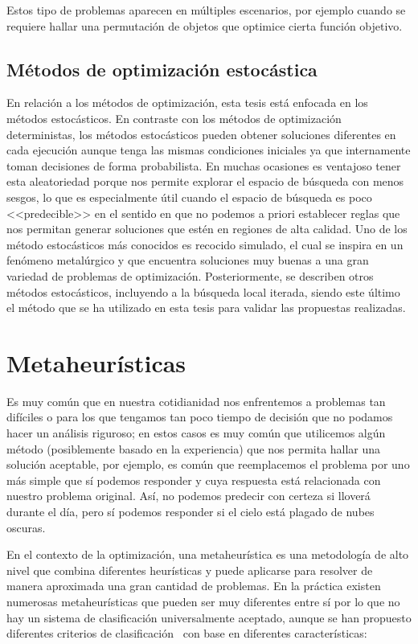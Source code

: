 Estos tipo de problemas aparecen en múltiples escenarios, por ejemplo cuando se requiere hallar una permutación de objetos que optimice cierta función objetivo.

\subsection*{Métodos de optimización estocástica}

En relación a los métodos de optimización, esta tesis está enfocada en los métodos estocásticos.
%
En contraste con los métodos de optimización deterministas, los métodos estocásticos pueden obtener soluciones diferentes en cada ejecución aunque tenga las mismas 
condiciones iniciales ya que internamente toman decisiones de forma probabilista.
%
En muchas ocasiones es ventajoso tener esta aleatoriedad porque nos permite explorar el espacio de búsqueda con menos sesgos, lo que es especialmente útil cuando el 
espacio de búsqueda es poco <<predecible>> en el sentido en que no podemos a priori establecer reglas que nos permitan generar soluciones que estén en regiones de alta
calidad. 
%
Uno de los método estocásticos más conocidos es recocido simulado, el cual se inspira en un fenómeno metalúrgico y que encuentra soluciones muy buenas a una gran 
variedad de problemas de optimización.
%
Posteriormente, se describen otros métodos estocásticos, incluyendo a la búsqueda local iterada, siendo este último el método que se ha utilizado en esta tesis para
validar las propuestas realizadas.





\section{Metaheurísticas}
Es muy común que en nuestra cotidianidad nos enfrentemos a problemas tan difíciles o para los que tengamos tan poco tiempo de decisión que no podamos hacer 
un análisis riguroso;
en estos casos es muy común que utilicemos algún método (posiblemente basado en la experiencia) que nos permita hallar una solución aceptable, por ejemplo, 
es común que reemplacemos el problema por uno más simple que sí podemos responder y cuya respuesta está relacionada con nuestro problema original.
%
Así, no podemos predecir con certeza si lloverá durante el día, pero sí podemos responder si el cielo está plagado de nubes oscuras.

En el contexto de la optimización, una metaheurística es una metodología de alto nivel que combina diferentes heurísticas y puede aplicarse para resolver 
de manera aproximada una gran cantidad de problemas. 
%
En la práctica existen numerosas metaheurísticas que pueden ser muy diferentes entre sí por lo que no hay un sistema de clasificación universalmente aceptado, 
aunque se han propuesto diferentes criterios de clasificación~\cite{Stegherr2020} con base en diferentes características:

